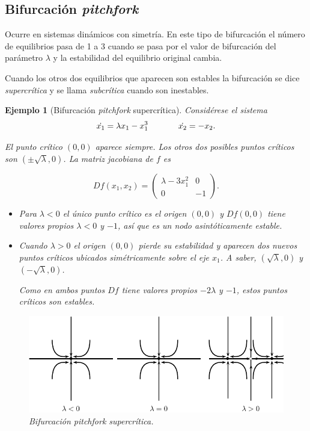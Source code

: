 \documentclass[11pt]{book}
\theoremstyle{definition}
\numberwithin{definition}{section}
\theoremstyle{theorem}
\numberwithin{theorem}{section}
\numberwithin{lemma}{section}
\numberwithin{corollary}{section}
\theoremstyle{plain}
\newtheorem{example}{Ejemplo}
\numberwithin{example}{section}
\begin{document}
\newpage %

\subsection{Bifurcación \textit{pitchfork}}

Ocurre en sistemas dinámicos con simetría. En este tipo de bifurcación el número de equilibrios pasa de 1 a 3 cuando se pasa por el valor de bifurcación del parámetro $\lambda$ y la estabilidad del equilibrio original cambia.

Cuando los otros dos equilibrios que aparecen son estables la bifurcación se dice \emph{supercrítica} y se llama \emph{subcrítica} cuando son inestables.

\begin{example}[Bifurcación \textit{pitchfork} supercrítica]
Considérese el sistema
$$ 
	\dot{x_1} = \lambda x_1 - x_1^3 \hspace{0.5in} \dot{x_2} = -x_2.
$$

El punto crítico $(0,0)$ aparece siempre. Los otros dos posibles puntos críticos son $(\pm \sqrt{\lambda}, 0)$.
La matriz jacobiana de $f$ es

$$
	Df(x_1,x_2) = \left( \begin{array}{ll}
		\lambda - 3x_1^2 & 0 \\
		0 & -1
	\end{array} \right).
$$

\begin{itemize}
	\item Para $\lambda < 0$ el único punto crítico es el origen $(0,0)$ y $Df(0,0)$ tiene valores propios $\lambda < 0$ y $-1$, así que es un nodo asintóticamente estable.
	\item Cuando $\lambda > 0$ el origen $(0,0)$ pierde su estabilidad y aparecen dos nuevos puntos críticos ubicados simétricamente sobre el eje $x_1$. A saber, $(\sqrt{\lambda}, 0)$ y $(-\sqrt{\lambda}, 0)$. 

Como en ambos puntos $Df$ tiene valores propios $-2\lambda$ y $-1$, estos puntos críticos son estables.
\end{itemize}

\begin{figure}[ht] \centering
    \includegraphics[scale=1.0]{figures/bifurcations-pitchforksupercritical.pdf} 
    \caption{Bifurcación \textit{pitchfork} supercrítica.}
\end{figure}

\end{example}
\end{document}
